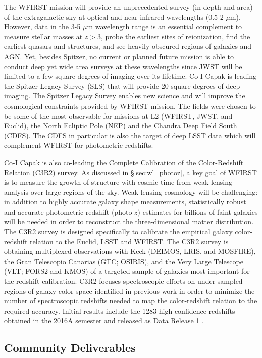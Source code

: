 The WFIRST mission will provide an unprecedented survey (in depth and area) of the extragalactic sky at optical and near infrared wavelengths (0.5-2 $\mu$m).  However, data in the 3-5 $\mu$m wavelength range is an essential complement to measure stellar masses at $z>$3, probe the earliest sites of reionization, find the earliest quasars and structures, and see heavily obscured regions of galaxies and AGN.  Yet, besides Spitzer, no current or planned future mission is able to conduct deep yet wide area surveys at these wavelengths since JWST will be limited to a few square degrees of imaging over its lifetime. Co-I Capak is leading the Spitzer Legacy Survey (SLS) that will provide 20 square degrees of deep imaging. The Spitzer Legacy Survey enables new science and will improve the cosmological constraints provided by WFIRST mission.  The fields were chosen to be some of the most observable for missions at L2 (WFIRST, JWST, and Euclid), the North Ecliptic Pole (NEP) and the Chandra Deep Field South (CDFS).  The CDFS in particular is also the target of deep LSST data which will complement WFIRST for photometric redshifts.

Co-I Capak is also co-leading the Complete Calibration of the Color-Redshift Relation (C3R2) survey. As discussed in \S \ref{sec:wl_photoz}, a key goal of WFIRST is to measure the growth of structure with cosmic time from weak lensing analysis over large regions of the sky. Weak lensing cosmology will be challenging: in addition to highly accurate galaxy shape measurements, statistically robust and accurate photometric redshift (photo-$z$) estimates for billions of faint galaxies will be needed in order to reconstruct the three-dimensional matter distribution. The C3R2 survey is designed specifically to calibrate the empirical galaxy color-redshift relation to the Euclid, LSST and WFIRST. The C3R2 survey is obtaining multiplexed observations with Keck (DEIMOS, LRIS, and MOSFIRE), the Gran Telescopio Canarias (GTC; OSIRIS), and the Very Large Telescope (VLT; FORS2 and KMOS) of a targeted sample of galaxies most important for the redshift calibration. C3R2 focuses spectroscopic efforts on under-sampled regions of galaxy color space identified in previous work in order to minimize the number of spectroscopic redshifts needed to map the color-redshift relation to the required accuracy. Initial results include the 1283 high confidence redshifts obtained in the 2016A semester and released as Data Release 1 \citep{Masters2017}.


\subsection{Community Deliverables}

